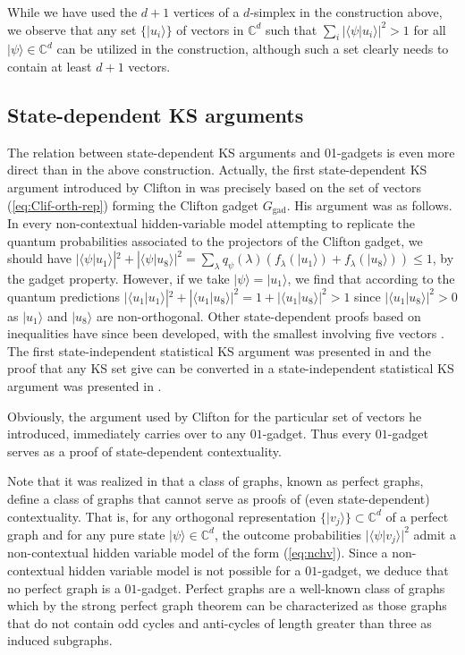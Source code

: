 \documentclass[twocolumn, a4paper, superscriptaddress,nofootinbib, accepted=2020-08-07, hyperref]{quantumarticle}
\begin{document}
While we have used the $d+1$ vertices of a $d$-simplex in the construction above, we observe that any set $\{|u_i \rangle\}$ of vectors in $\mathbb{C}^d$ such that $\sum_{i} |\langle \psi | u_i \rangle|^2 > 1$ for all $| \psi \rangle \in \mathbb{C}^d$ can be utilized in the construction, although such a set clearly needs to contain at least $d+1$ vectors. 

\subsection{State-dependent KS arguments}

The relation between state-dependent KS arguments and 01-gadgets is even more direct than in the above construction. Actually, the first state-dependent KS argument introduced by Clifton in \cite{Clifton93} was precisely based on the set of vectors (\ref{eq:Clif-orth-rep}) forming the Clifton gadget $G_\text{gad}$. His argument was as follows. In every non-contextual hidden-variable model attempting to replicate the quantum probabilities associated to the projectors of the Clifton gadget, we should have $|\langle\psi|u_1\rangle|^2+|\langle\psi|u_8\rangle|^2=\sum_\lambda q_\psi(\lambda) \left(f_\lambda(|u_1\rangle)+f_\lambda(|u_8\rangle)\right)\leq 1$, by the gadget property. However, if we take $|\psi\rangle=|u_1\rangle$, we find that according to the quantum predictions $|\langle u_1|u_1\rangle|^2+|\langle u_1|u_8\rangle|^2=1+|\langle u_1|u_8\rangle|^2>1$ since $|\langle u_1|u_8\rangle|^2>0$ as $|u_1\rangle$ and $|u_8\rangle$ are non-orthogonal. Other state-dependent proofs based on inequalities have since been developed, with the smallest involving five vectors \cite{KCBS08}. The first state-independent statistical KS argument was presented in \cite{Cab08} and the proof that any KS set give can be converted in a state-independent statistical KS argument was presented in \cite{BBCP09}.



Obviously, the argument used by Clifton for the particular set of vectors he introduced, immediately carries over to any $01$-gadget. Thus every $01$-gadget serves as a proof of state-dependent contextuality.

Note that it was realized in \cite{CDLP14} that a class of graphs, known as perfect graphs, define a class of graphs that cannot serve as proofs of (even state-dependent) contextuality. That is, for any orthogonal representation $\{|v_j \rangle\} \subset \mathbb{C}^d$ of a perfect graph and for any pure state $|\psi \rangle \in \mathbb{C}^d$, the outcome probabilities $|\langle \psi|v_j\rangle|^2$ admit a non-contextual hidden variable model of the form (\ref{eq:nchv}). Since a non-contextual hidden variable model is not possible for a $01$-gadget, we deduce that no perfect graph is a $01$-gadget. Perfect graphs are a well-known class of graphs which by the strong perfect graph theorem \cite{CRST06} can be characterized as those graphs that do not contain odd cycles and anti-cycles of length greater than three as induced subgraphs. %
\end{document}
